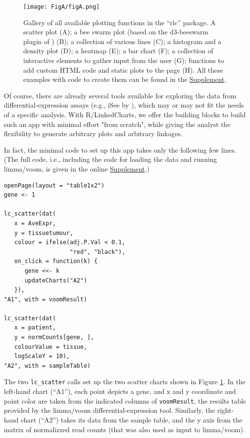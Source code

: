 \documentclass[twocolumn,10pt]{article}
\newcommand{\Supplement}{\href{https://anders-biostat.github.io/lc-paper/}{Supplement}}
\begin{document}
\begin{figure}
	\texttt{[image: FigA/figA.png]}
	\caption{Gallery of all available plotting functions in the ``rlc'' package. A scatter plot (A); a bee swarm plot (based on the d3-beeswarm plugin of \citet{lebeau_2017}) (B); a collection of various lines (C); a histogram and a density plot (D); a heatmap (E); a bar chart (F); a collection of interactive elements to gather input from the user (G); functions to add custom HTML code and static plots to the page (H). All these examples with code to create them can be found in the \Supplement.}
	\label{FigA}
\end{figure}

Of course, there are already several tools available for exploring the data from differential-expression assays (e.g., iSee by \citet{rue_2018}), which may or may not fit the needs of a specific analysis. With R/LinkedCharts, we offer the building blocks to build such an app with minimal effort "from scratch", while giving the analyst the flexibility to generate arbitrary plots and arbitrary linkages.

In fact, the minimal code to set up this app takes only the following few lines. (The full code, i.e., including the code for loading the data and running limma/voom, is given in the online \Supplement.)

\begin{verbatim}
openPage(layout = "table1x2")
gene <- 1

lc_scatter(dat(
   x = AveExpr,
   y = tissuetumour,
   colour = ifelse(adj.P.Val < 0.1, 
                   "red", "black"),
   on_click = function(k) {
      gene <<- k
      updateCharts("A2")
   }),
"A1", with = voomResult)

lc_scatter(dat(
   x = patient,
   y = normCounts[gene, ],
   colourValue = tissue, 
   logScaleY = 10),
"A2", with = sampleTable)
\end{verbatim}

The two \texttt{lc_scatter} calls set up the two scatter charts shown in Figure \ref{FigA}. In the left-hand chart (``A1''), each point depicts a gene, and x and y coordinate and point color are taken from the indicated columns of \texttt{voomResult}, the results table provided by the limma/voom differential-expression tool. Similarly, the right-hand chart (``A2'') takes its data from the sample table, and the y axis from the matrix of normalizxed read counts (that was also used as input to limma/voom).
\end{document}
